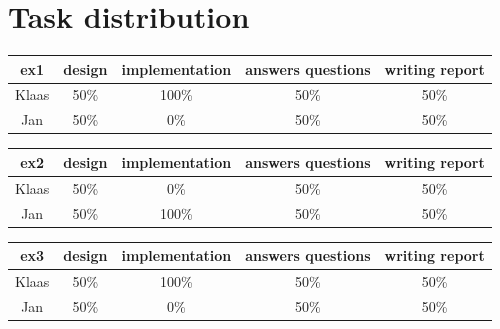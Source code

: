 \documentclass[a4paper]{article}
\begin{document}
\newpage
\section*{Task distribution}

\begin{table}[H]
\centering
\begin{tabular}{ccccc}
ex1 & design & implementation & answers questions & writing report \\
\hline
Klaas & 50\% & 100\% & 50\% & 50\% \\
\hline
Jan & 50\% & 0\% & 50\% & 50\% \\
\end{tabular}
\end{table}

\begin{table}[H]
\centering
\begin{tabular}{ccccc}
ex2 & design & implementation & answers questions & writing report \\
\hline
Klaas & 50\% & 0\% & 50\% & 50\% \\
\hline
Jan & 50\% & 100\% & 50\% & 50\% \\
\end{tabular}
\end{table}

\begin{table}[H]
\centering
\begin{tabular}{ccccc}
ex3 & design & implementation & answers questions & writing report \\
\hline
Klaas & 50\% & 100\% & 50\% & 50\% \\
\hline
Jan & 50\% & 0\% & 50\% & 50\% \\
\end{tabular}
\end{table} 
\end{document}
